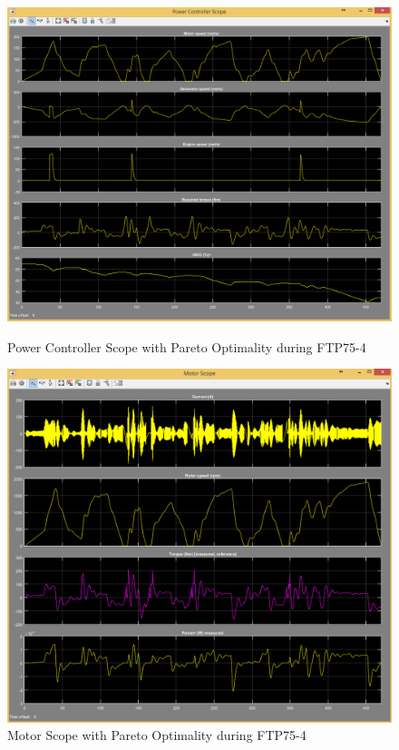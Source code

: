 \begin{figure}[hp]
\centering
\includegraphics[scale=0.4]{figures/Pareto/FTP75-4/powerController05Juli}
\caption{Power Controller Scope with Pareto Optimality during FTP75-4}
\label{fig:pcpo4}
\includegraphics[scale=0.37]{figures/Pareto/FTP75-4/motor05Juli}
\caption{Motor Scope with Pareto Optimality during FTP75-4}
\label{fig:mpo4}
\end{figure}

